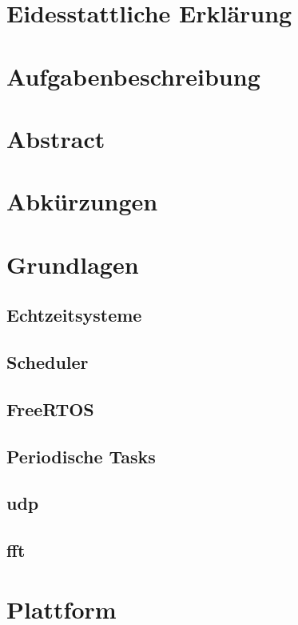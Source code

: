 \documentclass{scrartcl}
\begin{document}
	\begin{titlepage}
		
	\end{titlepage}
	\clearpage 
	\section*{Eidesstattliche Erklärung}
		
		\clearpage
	\section*{Aufgabenbeschreibung}
		
		\clearpage
	\section*{Abstract}
		
		\clearpage
	\tableofcontents
		\clearpage
	\section*{Abkürzungen}
		
		\clearpage
	\clearpage
	\section{Grundlagen}
		
		\subsection{Echtzeitsysteme}
			
		\subsection{Scheduler}
			
		\subsection{FreeRTOS}
			
		\subsection{Periodische Tasks}
			
		\subsection{\ac{udp}}
			
		\subsection{\ac{fft}}
			
		\clearpage
	\section{Plattform}
		
		\clearpage
	\listoffigures
		\clearpage
	\listoftables
		\printbibliography{}
		\clearpage
\end{document}
